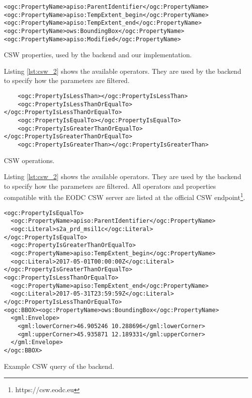 \documentclass[draft,final]{vutinfth} %
\newenvironment{code}{\captionsetup{type=listing}}{}
\newcommand{\bgoesswein}[1]{{\color{blue}#1}}
\begin{document}
\begin{code}
	\begin{verbatim}
<ogc:PropertyName>apiso:ParentIdentifier</ogc:PropertyName>
<ogc:PropertyName>apiso:TempExtent_begin</ogc:PropertyName>
<ogc:PropertyName>apiso:TempExtent_end</ogc:PropertyName>
<ogc:PropertyName>ows:BoundingBox</ogc:PropertyName>
<ogc:PropertyName>apiso:Modified</ogc:PropertyName>
	\end{verbatim}
	\caption{CSW properties, used by the backend and our implementation.}
	\label{lst:csw_1}
\end{code} 
\bgoesswein{
Listing \ref{lst:csw_2} shows the available operators. They are used by the backend to specify how the parameters are filtered. 
 }
\begin{code}
	\begin{verbatim}
	<ogc:PropertyIsLessThan></ogc:PropertyIsLessThan>
	<ogc:PropertyIsLessThanOrEqualTo></ogc:PropertyIsLessThanOrEqualTo>
	<ogc:PropertyIsEqualTo></ogc:PropertyIsEqualTo>
	<ogc:PropertyIsGreaterThanOrEqualTo></ogc:PropertyIsGreaterThanOrEqualTo>
	<ogc:PropertyIsGreaterThan></ogc:PropertyIsGreaterThan>
	\end{verbatim}
	\caption{CSW operations.}
	\label{lst:csw_2}
\end{code}  
\bgoesswein{
	Listing \ref{lst:csw_2} shows the available operators. They are used by the backend to specify how the parameters are filtered. All operators and properties compatible with the EODC CSW server are listed at the official CSW endpoint\footnote{https://csw.eodc.eu}. 
}
\newpage
\begin{code}
	\begin{verbatim}
<ogc:PropertyIsEqualTo>
  <ogc:PropertyName>apiso:ParentIdentifier</ogc:PropertyName>
  <ogc:Literal>s2a_prd_msil1c</ogc:Literal>
</ogc:PropertyIsEqualTo>
  <ogc:PropertyIsGreaterThanOrEqualTo>
  <ogc:PropertyName>apiso:TempExtent_begin</ogc:PropertyName>
  <ogc:Literal>2017-05-01T00:00:00Z</ogc:Literal>
</ogc:PropertyIsGreaterThanOrEqualTo>
<ogc:PropertyIsLessThanOrEqualTo>
  <ogc:PropertyName>apiso:TempExtent_end</ogc:PropertyName>
  <ogc:Literal>2017-05-31T23:59:59Z</ogc:Literal>
</ogc:PropertyIsLessThanOrEqualTo>
<ogc:BBOX><ogc:PropertyName>ows:BoundingBox</ogc:PropertyName>
  <gml:Envelope>
    <gml:lowerCorner>46.905246 10.288696</gml:lowerCorner>
    <gml:upperCorner>45.935871 12.189331</gml:upperCorner>
  </gml:Envelope>
</ogc:BBOX>
	\end{verbatim}
	\caption{Example CSW query of the backend.}
	\label{lst:csw_3}
\end{code}  
\end{document}
